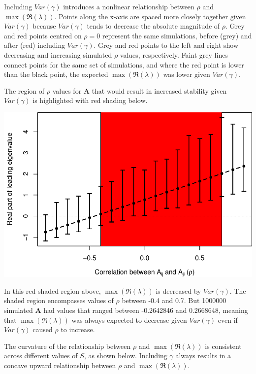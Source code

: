 \documentclass[]{article}
\begin{document}
Including \(Var(\gamma)\) introduces a nonlinear relationship between
\(\rho\) and \(\max(\Re(\lambda))\). Points along the x-axis are spaced
more closely together given \(Var(\gamma)\) because \(Var(\gamma)\)
tends to decrease the absolute magnitude of \(\rho\). Grey and red
points centred on \(\rho = 0\) represent the same simulations, before
(grey) and after (red) including \(Var(\gamma)\). Grey and red points to
the left and right show decreasing and increasing simulated \(\rho\)
values, respectively. Faint grey lines connect points for the same set
of simulations, and where the red point is lower than the black point,
the expected \(\max(\Re(\lambda))\) was lower given \(Var(\gamma)\).

The region of \(\rho\) values for \(\textbf{A}\) that would result in
increased stability given \(Var(\gamma)\) is highlighted with red
shading below.

\includegraphics{revision_notes_files/figure-latex/unnamed-chunk-9-1.pdf}

In this red shaded region above, \(\max(\Re(\lambda))\) is decreased by
\(Var(\gamma)\). The shaded region encompasses values of \(\rho\)
between -0.4 and 0.7. But 1000000 simulated \(\textbf{A}\) had values
that ranged between -0.2642846 and 0.2668648, meaning that
\(\max(\Re(\lambda))\) was always expected to decrease given
\(Var(\gamma)\) even if \(Var(\gamma)\) caused \(\rho\) to increase.

The curvature of the relationship between \(\rho\) and
\(\max(\Re(\lambda))\) is consistent across different values of \(S\),
as shown below. Including \(\gamma\) always results in a concave upward
relationship between \(\rho\) and \(\max(\Re(\lambda))\).
\end{document}
